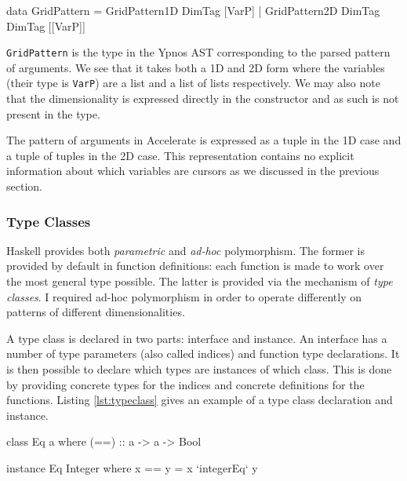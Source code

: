 \documentclass[
    12pt,
    a4paper,
    twoside,
    openright,
    ]{scrbook}
\begin{document}
\begin{hflisting}[label={lst:gridpattern}, caption=The data type which stores
  the grid patterns in Ypnos. Notice that the dimensionality is not exposed in
  the type.]
data GridPattern = GridPattern1D DimTag [VarP] |
                   GridPattern2D DimTag DimTag [[VarP]]
\end{hflisting}

\texttt{GridPattern} is the type in the Ypnos AST corresponding to the parsed
pattern of arguments. We see that it takes both a 1D and 2D form where the
variables (their type is \texttt{VarP}) are a list and a list of lists
respectively. We may also note that the dimensionality is expressed directly in
the constructor and as such is not present in the type.

The pattern of arguments in Accelerate is expressed as a tuple in the 1D case
and a tuple of tuples in the 2D case. This representation contains no explicit
information about which variables are cursors as we discussed in the previous
section.

\subsubsection{Type Classes}
\label{sec:typeclasses}

Haskell provides both \emph{parametric} and \emph{ad-hoc} polymorphism. The
former is provided by default in function definitions: each function is made to
work over the most general type possible. The latter is provided via the
mechanism of \emph{type classes}.  I required ad-hoc polymorphism in order to
operate differently on patterns of different dimensionalities.

A type class is declared in two parts: interface and instance. An interface has
a number of type parameters (also called indices) and function type
declarations. It is then possible to declare which types are instances of which
class. This is done by providing concrete types for the indices and concrete
definitions for the functions. Listing \ref{lst:typeclass} gives an example of a
type class declaration and instance.

\begin{hflisting}[label=lst:typeclass, caption={An example type class for
    equality. Showing the declaration and the instance for integers. Where
    \texttt{integerEq} is the implementation of integer equality on the target
    machine.}]

class Eq a where
  (==) :: a -> a -> Bool

instance Eq Integer where
  x == y =  x `integerEq` y

\end{hflisting}
\end{document}
